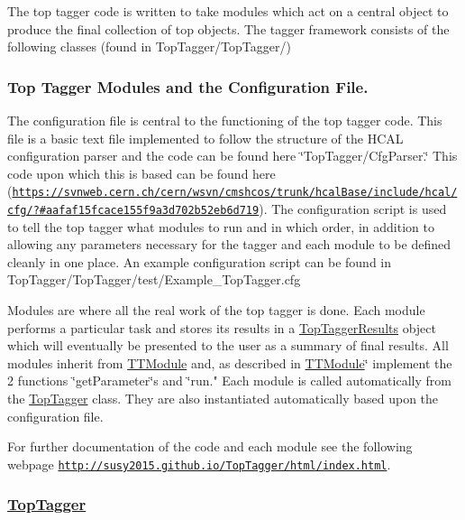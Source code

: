 The top tagger code is written to take modules which act on a central object to produce the final collection of top objects. The tagger framework consists of the following classes (found in Top\-Tagger/\-Top\-Tagger/)

\subsubsection*{Top Tagger Modules and the Configuration File.}

The configuration file is central to the functioning of the top tagger code. This file is a basic text file implemented to follow the structure of the H\-C\-A\-L configuration parser and the code can be found here \char`\"{}\-Top\-Tagger/\-Cfg\-Parser.\char`\"{} This code upon which this is based can be found here (\href{https://svnweb.cern.ch/cern/wsvn/cmshcos/trunk/hcalBase/include/hcal/cfg/?#aafaf15fcace155f9a3d702b52eb6d719}{\tt https\-://svnweb.\-cern.\-ch/cern/wsvn/cmshcos/trunk/hcal\-Base/include/hcal/cfg/?\#aafaf15fcace155f9a3d702b52eb6d719}). The configuration script is used to tell the top tagger what modules to run and in which order, in addition to allowing any parameters necessary for the tagger and each module to be defined cleanly in one place. An example configuration script can be found in Top\-Tagger/\-Top\-Tagger/test/\-Example\-\_\-\-Top\-Tagger.\-cfg

Modules are where all the real work of the top tagger is done. Each module performs a particular task and stores its results in a \hyperlink{classTopTaggerResults}{Top\-Tagger\-Results} object which will eventually be presented to the user as a summary of final results. All modules inherit from \hyperlink{classTTModule}{T\-T\-Module} and, as described in \hyperlink{classTTModule}{T\-T\-Module}\char`\"{} implement the 2 functions \char`\"{}get\-Parameter\char`\"{}s and \char`\"{}run." Each module is called automatically from the \hyperlink{classTopTagger}{Top\-Tagger} class. They are also instantiated automatically based upon the configuration file.

For further documentation of the code and each module see the following webpage \href{http://susy2015.github.io/TopTagger/html/index.html}{\tt http\-://susy2015.\-github.\-io/\-Top\-Tagger/html/index.\-html}.

\subsubsection*{\hyperlink{classTopTagger}{Top\-Tagger}}

